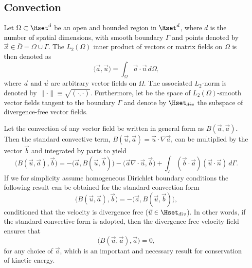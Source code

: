 \subsection{Convection}
\label{sec:Convection}
Let $\Omega \subset \Rset^d$ be an open and bounded region in $\Rset^d$, where $d$ is the number of spatial dimensions, with smooth boundary $\Gamma$ and points denoted by $\vec{x}\in \overline{\Omega}=\Omega \cup \Gamma$. The $L_2(\Omega)$ inner product of vectors or matrix fields on $\Omega$ is then denoted as
\begin{equation}
 \bigl( \vec{a},\vec{u} \bigr) = \int_{\Omega} \vec{a}\cdot \vec{u}\, d\Omega,
 \label{eq:L2}
\end{equation}
where $\vec{a}$ and $\vec{u}$ are arbitrary vector fields on $\Omega$. The associated $L_2$-norm is denoted by $\| \cdot \| \equiv \sqrt{\left( \cdot, \cdot \right)}$. Furthermore, let \Hset be the space of $L_2(\Omega)$-smooth vector fields tangent to the boundary $\Gamma$ and denote by $\Hset_{div}$ the subspace of divergence-free vector fields.

Let the convection of any vector field be written in general form as $B(\vec{u},\vec{a})$. Then the standard convective term, $B(\vec{u},\vec{a}) = \vec{u}\cdot \nabla \vec{a} $, can be multiplied by the vector $\vec{b}$ and integrated by parts to yield
\begin{equation}
 \bigl( B(\vec{u}, \vec{a}), \vec{b}\bigr) = -\bigl( \vec{a}, B(\vec{u},\vec{b})\bigr) - \bigl( \vec{a} \nabla \cdot \vec{u} , \vec{b} \bigr) + \int_{\Gamma} \left(\vec{b} \cdot \vec{a} \right)\left(\vec{u} \cdot \vec{n} \right) \, d\Gamma.
\label{eq:Bu1}
\end{equation}
If we for simplicity assume homogeneous Dirichlet boundary conditions the following result can be obtained for the standard convection form
\begin{equation}
\bigl( B(\vec{u},\vec{a}), \vec{b} \bigr) = -\bigl( \vec{a}, B(\vec{u},\vec{b}) \bigr),
\label{eq:Bu2}
\end{equation}
conditioned that the velocity is divergence free ($\vec{u}\in \Hset_{div}$). In other words, if the standard convective form is adopted, then the divergence free velocity field ensures that
\begin{equation} 
\bigl( B(\vec{u}, \vec{a}), \vec{a} \bigr) = 0,
\label{eq:B0}
\end{equation}
for any choice of $\vec{a}$, which is an important and necessary result for conservation of kinetic energy.

